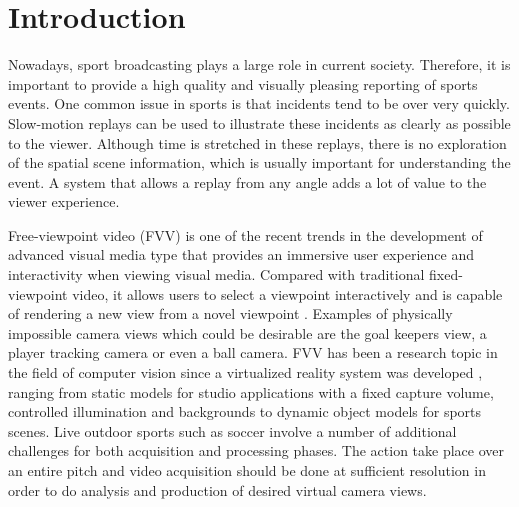 \section{Introduction}
Nowadays, sport broadcasting plays a large role in current society.
Therefore, it is important to provide a high quality and visually pleasing reporting of sports events.
One common issue in sports is that incidents tend to be over very quickly.
Slow-motion replays can be used to illustrate these incidents as clearly as possible to the viewer. 
Although time is stretched in these replays, there is no exploration of the spatial scene information, which is 
usually important for understanding the event.
A system that allows a replay from any angle adds a lot of value to the viewer experience.



Free-viewpoint video (FVV) is one of the recent trends in the development of advanced visual media type
that provides an immersive user experience and interactivity when viewing
visual media. Compared with traditional fixed-viewpoint
video, it allows users to select a viewpoint interactively and
is capable of rendering a new view from a novel viewpoint \cite{05_plane_sweeping}.
Examples of physically impossible camera views which
could be desirable are the goal keepers view, a player tracking camera or even a
ball camera.
FVV has been a research topic in the field of computer vision 
since a virtualized reality system was developed \cite{04_fast_FVV_01},
ranging from static models for studio applications with a fixed
capture volume, controlled illumination and backgrounds \cite{02_iview} 
to dynamic object models for sports scenes.
Live outdoor sports such as soccer involve a number of additional challenges for both acquisition and processing 
phases. 
The action take place over an entire pitch and video acquisition should be done at sufficient resolution in order to
do analysis and production of desired virtual camera views.

